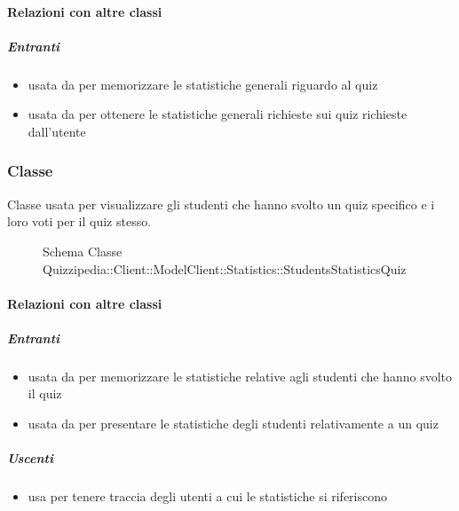 \paragraph{Relazioni con altre classi}
\subparagraph{Entranti}
\begin{itemize}
\item usata da  per memorizzare le statistiche generali riguardo al quiz
\item usata da  per ottenere le statistiche generali richieste sui quiz richieste dall'utente
\end{itemize}
\subsubsection{Classe }
Classe usata per visualizzare gli studenti che hanno svolto un quiz specifico e i loro voti per il quiz stesso.
\begin{figure}[H]
\centering
\noindent{}
\caption[Schema Classe StudentsStatisticsQuiz]{Schema Classe Quizzipedia::Client::ModelClient::Statistics::StudentsStatisticsQuiz}
\end{figure}
\paragraph{Relazioni con altre classi}
\subparagraph{Entranti}
\begin{itemize}
\item usata da  per memorizzare le statistiche relative agli studenti che hanno svolto il quiz
\item usata da  per presentare le statistiche degli studenti relativamente a un quiz
\end{itemize}
\subparagraph{Uscenti}
\begin{itemize}
\item usa  per tenere traccia degli utenti a cui le statistiche si riferiscono
\end{itemize}
